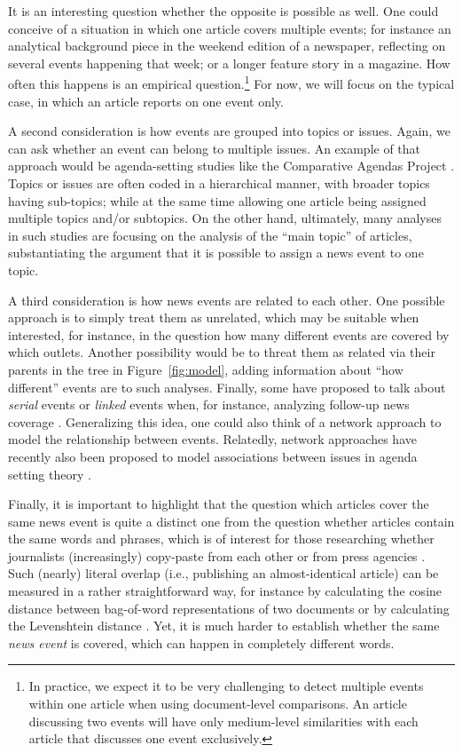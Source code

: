 \documentclass[a4paper,man,natbib,floatsintext,mask]{apa6}
\begin{document}
It is an interesting question whether the opposite is possible as well. One could conceive of a situation in which one article covers multiple events; for instance an analytical background piece in the weekend edition of a newspaper, reflecting on several events happening that week; or a longer feature story in a magazine. How often this happens is an empirical question.\footnote{In practice, we expect it to be very challenging to detect multiple events within one article when using document-level comparisons. An article discussing two events will have only medium-level similarities with each article that discusses one event exclusively.}
For now, we will focus on the typical case, in which an article reports on one event only.

A second consideration is how events are grouped into topics or issues. Again, we can ask whether an event can belong to multiple issues. An example of that approach would be agenda-setting studies like the Comparative Agendas Project \citep{Baumgartner2006}. Topics or issues are often coded in a hierarchical manner, with broader topics having sub-topics; while at the same time allowing one article being assigned multiple topics and/or subtopics. On the other hand, ultimately, many analyses in such studies are focusing on the analysis of the ``main topic'' of articles, substantiating the argument that it is possible to assign a news event to one topic.

A third consideration is how news events are related to each other. One possible approach is to simply treat them as unrelated, which may be suitable when interested, for instance, in the question how many different events are covered by which outlets. Another possibility would be to threat them as related via their parents in the tree in Figure~\ref{fig:model}, adding information about ``how different'' events are to such analyses. Finally, some have proposed to talk about \emph{serial} events or  \emph{linked} events when, for instance, analyzing follow-up news coverage \citep[see, e.g.,][]{Geiss2018}. Generalizing this idea, one could also think of a network approach to model the relationship between events. Relatedly, network approaches have recently also been proposed to model associations between issues in agenda setting theory \citep{Guo2013}.

Finally, it is important to highlight that the question which articles cover the same news event is quite a distinct one from the question whether articles contain the same words and phrases, which is of interest for those researching whether journalists (increasingly) copy-paste from each other or from press agencies \cite[see, e.g., ][]{davies2009}. Such (nearly) literal overlap (i.e., publishing an almost-identical article) can be measured in a rather straightforward way, for instance by calculating the cosine distance between bag-of-word representations of two documents or by calculating the Levenshtein distance \citep{Boumans2018,Welbers2016}. Yet, it is much harder to establish whether the same \emph{news event} is covered, which can happen in completely different words.
\end{document}
